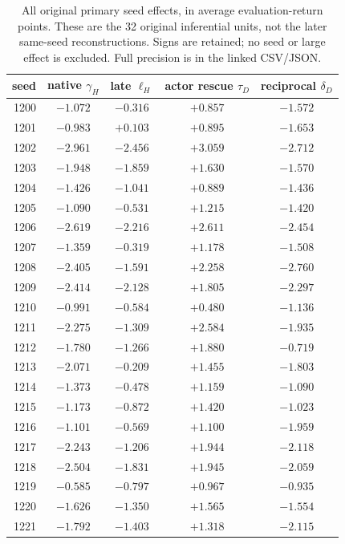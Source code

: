 \begin{table}[p]
\centering
\caption{All original primary seed effects, in average evaluation-return points. These are the 32 original inferential units, not the later same-seed reconstructions. Signs are retained; no seed or large effect is excluded. Full precision is in the linked CSV/JSON.}
\label{app:seedtable}
\small
\begin{tabular}{rcccc}
\toprule
seed & native $\gamma_H$ & late $\ell_H$ & actor rescue $\tau_D$ & reciprocal $\delta_D$ \\
\midrule
1200 & $-1.072$ & $-0.316$ & $+0.857$ & $-1.572$ \\
1201 & $-0.983$ & $+0.103$ & $+0.895$ & $-1.653$ \\
1202 & $-2.961$ & $-2.456$ & $+3.059$ & $-2.712$ \\
1203 & $-1.948$ & $-1.859$ & $+1.630$ & $-1.570$ \\
1204 & $-1.426$ & $-1.041$ & $+0.889$ & $-1.436$ \\
1205 & $-1.090$ & $-0.531$ & $+1.215$ & $-1.420$ \\
1206 & $-2.619$ & $-2.216$ & $+2.611$ & $-2.454$ \\
1207 & $-1.359$ & $-0.319$ & $+1.178$ & $-1.508$ \\
1208 & $-2.405$ & $-1.591$ & $+2.258$ & $-2.760$ \\
1209 & $-2.414$ & $-2.128$ & $+1.805$ & $-2.297$ \\
1210 & $-0.991$ & $-0.584$ & $+0.480$ & $-1.136$ \\
1211 & $-2.275$ & $-1.309$ & $+2.584$ & $-1.935$ \\
1212 & $-1.780$ & $-1.266$ & $+1.880$ & $-0.719$ \\
1213 & $-2.071$ & $-0.209$ & $+1.455$ & $-1.803$ \\
1214 & $-1.373$ & $-0.478$ & $+1.159$ & $-1.090$ \\
1215 & $-1.173$ & $-0.872$ & $+1.420$ & $-1.023$ \\
1216 & $-1.101$ & $-0.569$ & $+1.100$ & $-1.959$ \\
1217 & $-2.243$ & $-1.206$ & $+1.944$ & $-2.118$ \\
1218 & $-2.504$ & $-1.831$ & $+1.945$ & $-2.059$ \\
1219 & $-0.585$ & $-0.797$ & $+0.967$ & $-0.935$ \\
1220 & $-1.626$ & $-1.350$ & $+1.565$ & $-1.554$ \\
1221 & $-1.792$ & $-1.403$ & $+1.318$ & $-2.115$ \\

\end{tabular}
\end{table}
